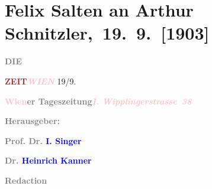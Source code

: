 

\renewcommand{\erwaehntePersonen}{Personen: Max Eugen Burckhard, Karl Glossy, Heinrich Kanner, Richard Muther, Ferdinand von Saar, August Sauer, Isidor Singer}
\renewcommand{\erwaehnteInstitutionen}{Institutionen: Die Zeit}
\renewcommand{\erwaehnteOrte}{Orte: Wien, Wipplingerstraße}
\renewcommand{\erwaehnteWerke}{}
\section[ Felix Salten an Arthur Schnitzler, 19. 9. {[}1903{]}]{Felix Salten an Arthur Schnitzler, 19. 9. {[}1903{]}}
\nopagebreak{}
\rehead{ }\normalsize\beginnumbering{}
\toendnotes[C]{\smallbreak\pagebreak[2]}
\toendnotes[C]{\smallbreak}
\pstart
           \noindent{}{\pb}\textcolor{gray}{\textbf{DIE}}\pend
           
\pstart
           \textcolor{gray}{\textbf{\textcolor{brown}{ZEIT}{}\ledrightnote{\textcolor{brown}{Die Zeit}}}}\hfill \textcolor{gray}{\textbf{\textcolor{pink}{\emph{WIEN}}{}\ledrightnote{\textcolor{pink}{Wien}}}}{ }19/9.\pend
           
\pstart
           \textcolor{gray}{\textbf{\textcolor{pink}{Wien}{}\ledrightnote{\textcolor{pink}{Wien}}er Tageszeitung}}\hfill \textcolor{gray}{\textbf{\emph{\textcolor{pink}{I. Wipplingerstrasse 38}{}\ledrightnote{\textcolor{pink}{Wipplingerstraße}}}}}\pend
           
\pstart
           \textcolor{gray}{\textbf{Herausgeber:}}\pend
           
\pstart
           \textcolor{gray}{\textbf{\textbf{Prof. Dr. \textcolor{blue}{I. Singer}{}\ledrightnote{\textcolor{blue}{Isidor Singer}}}}}\pend
           
\pstart
           \textcolor{gray}{\textbf{\textbf{Dr. \textcolor{blue}{Heinrich Kanner}{}\ledrightnote{\textcolor{blue}{Heinrich Kanner}}}}}\pend
           
\pstart
           \textcolor{gray}{\textbf{\textbf{Redaction}}}\pend
           
